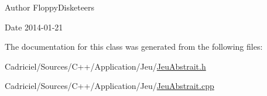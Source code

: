 \begin{DoxyAuthor}{Author}
Floppy\-Disketeers 
\end{DoxyAuthor}
\begin{DoxyDate}{Date}
2014-\/01-\/21 
\end{DoxyDate}


The documentation for this class was generated from the following files\-:\begin{DoxyCompactItemize}
\item 
Cadriciel/\-Sources/\-C++/\-Application/\-Jeu/\hyperlink{_jeu_abstrait_8h}{Jeu\-Abstrait.\-h}\item 
Cadriciel/\-Sources/\-C++/\-Application/\-Jeu/\hyperlink{_jeu_abstrait_8cpp}{Jeu\-Abstrait.\-cpp}\end{DoxyCompactItemize}
